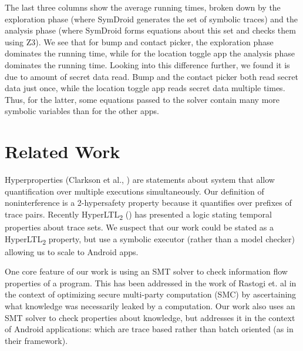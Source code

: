 \documentclass[10pt,conference,compsocconf]{IEEEtran}
\newcommand{\comment}[3][\color{red}]{{#1{[{#2}: {#3}]}}}
\newcommand{\jeff}[1]{\comment[\color{green}]{JSF}{#1}}
\begin{document}

The last three columns show the average running times, broken
down by the exploration phase (where SymDroid generates the set
of symbolic traces) and the analysis phase (where SymDroid forms
equations about this set and checks them using Z3). We see that for bump and contact picker,
the exploration phase dominates the running time, while for the
location toggle app the analysis phase dominates the running time.
Looking into this difference further, we found it is due to amount of
secret data read. Bump and the contact picker both read secret data
just once, while the location toggle app reads secret data multiple
times. Thus, for the latter, some equations passed to the solver
contain many more symbolic variables than for the other apps.

\section{Related Work}
\label{sec:related-work}

Hyperproperties (Clarkson et al., \cite{Clarkson:10}) are statements
about system that allow quantification over multiple executions
simultaneously.  Our definition of noninterference is a 2-hypersafety
property because it quantifies over prefixes of trace pairs.  Recently
HyperLTL\textsubscript{2} (\cite{Clarkson:2014}) has presented a logic
stating temporal properties about trace sets.  We suspect that our
work could be stated as a HyperLTL\textsubscript{2} property, but use
a symbolic executor (rather than a model checker) allowing us to scale
to Android apps.

One core feature of our work is using an SMT solver to check
information flow properties of a program.  This has been addressed in
the work of Rastogi et. al \cite{Rastogi:13} in the context of
optimizing secure multi-party computation (SMC) by ascertaining what
knowledge was necessarily leaked by a computation.  Our work also uses
an SMT solver to check properties about knowledge, but addresses it in
the context of Android applications: which are trace based rather than
batch oriented (as in their framework).
\end{document}
